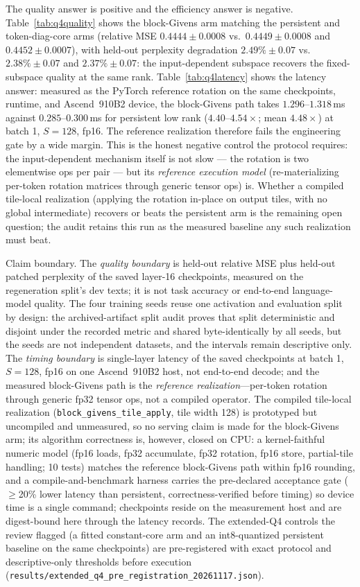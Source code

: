 The quality answer is positive and the efficiency answer is negative.
Table~\ref{tab:q4quality} shows the block-Givens arm matching the persistent
and token-diag-core arms (relative MSE $0.4444 \pm 0.0008$ vs.\ $0.4449 \pm
0.0008$ and $0.4452 \pm 0.0007$), with held-out perplexity degradation
$2.49\% \pm 0.07$ vs.\ $2.38\% \pm 0.07$ and $2.37\% \pm 0.07$: the
input-dependent subspace recovers the fixed-subspace quality at the same rank.
Table~\ref{tab:q4latency} shows the latency answer: measured as the PyTorch
reference rotation on the same checkpoints, runtime, and Ascend~910B2 device,
the block-Givens path takes $1.296$--$1.318$\,ms against $0.285$--$0.300$\,ms
for persistent low rank ($4.40$--$4.54\times$; mean $4.48\times$) at batch 1,
$S{=}128$, fp16. The reference realization therefore fails the engineering
gate by a wide margin. This is the honest negative control the protocol
requires: the input-dependent mechanism itself is not slow --- the rotation is
two elementwise ops per pair --- but its \emph{reference execution model}
(re-materializing per-token rotation matrices through generic tensor ops)
is. Whether a compiled tile-local realization (applying the rotation
in-place on output tiles, with no global intermediate) recovers or beats the
persistent arm is the remaining open question; the audit retains this run as
the measured baseline any such realization must beat.

Claim boundary. The \emph{quality boundary} is held-out relative MSE plus
held-out patched perplexity of the saved layer-16 checkpoints, measured on
the regeneration split's dev texts; it is not task accuracy or end-to-end
language-model quality. The four training seeds reuse one activation and
evaluation split by design: the archived-artifact split audit proves that
split deterministic and disjoint under the recorded metric and shared
byte-identically by all seeds, but the seeds are not independent datasets,
and the intervals remain descriptive only. The \emph{timing boundary} is
single-layer latency of the saved checkpoints at batch 1, $S{=}128$, fp16 on
one Ascend~910B2 host, not end-to-end decode; and the measured block-Givens
path is the \emph{reference realization}---per-token rotation through
generic fp32 tensor ops, not a compiled operator. The compiled tile-local
realization (\texttt{block\_givens\_tile\_apply}, tile width 128) is
prototyped but uncompiled and unmeasured, so no serving claim is made for
the block-Givens arm; its algorithm correctness is, however, closed on CPU:
a kernel-faithful numeric model (fp16 loads, fp32 accumulate, fp32 rotation,
fp16 store, partial-tile handling; 10 tests) matches the reference
block-Givens path within fp16 rounding, and a compile-and-benchmark harness
carries the pre-declared acceptance gate ($\ge$20\% lower latency than
persistent, correctness-verified before timing) so device time is a single
command; checkpoints reside on the measurement host and are
digest-bound here through the latency records. The extended-Q4 controls the
review flagged (a fitted constant-core arm and an int8-quantized persistent
baseline on the same checkpoints) are pre-registered with exact protocol and
descriptive-only thresholds before execution
(\texttt{results/extended\_q4\_pre\_registration\_20261117.json}).

